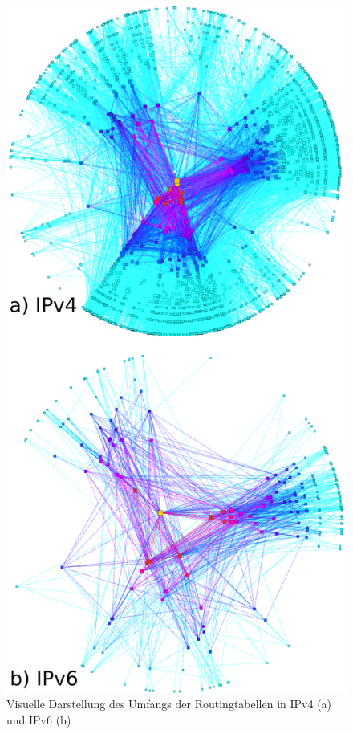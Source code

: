 \documentclass[a4paper,12pt]{scrartcl}
\begin{document}
\begin{figure}[htb]
\begin{center}
 \includegraphics[width=.7\hsize]{./images/ipv4v6map.png}
 \end{center}
\caption[Visuelle Darstellung des Umfangs der Routingtabellen in IPv4 und IPv6, Quelle: \url{http://greenbyte.ch/wp-content/uploads/2012/08/ipv4-ipv6.gif?cf3116}]{
	\label{ipv4v6map}Visuelle Darstellung des Umfangs der Routingtabellen in IPv4 (a) und IPv6 (b)
}
\end{figure}

\clearpage
\end{document}
